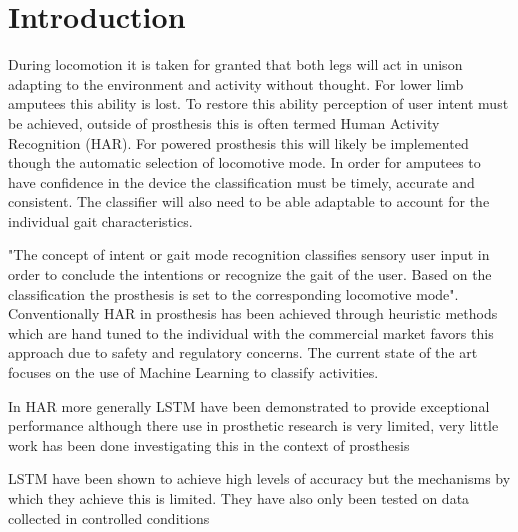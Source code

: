 \documentclass[sensors,article,submit,moreauthors,pdftex]{Definitions/mdpi}
\begin{document}

\section{Introduction} %
During locomotion it is taken for granted that both legs will act in unison adapting to the environment and activity without thought. For lower limb amputees this ability is lost. To restore this ability perception of user intent must be achieved, outside of prosthesis this is often termed Human Activity Recognition (HAR). For powered prosthesis this will likely be implemented though the automatic selection of locomotive mode\cite{Tucker2015, Windrich2016, Zhang2015}. In order for amputees to have confidence in the device the classification must be timely, accurate and consistent\cite{Pedroli2019, Sinha2011}. The classifier will also need to be able adaptable to account for the individual gait characteristics\cite{Ponce2016}.

"The concept of intent or gait mode recognition classifies sensory user input in order to conclude the intentions or recognize the gait of the user. Based on the classification the prosthesis is set to the corresponding locomotive mode"\cite{Windrich2016}. Conventionally HAR in prosthesis has been achieved through heuristic methods which are hand tuned to the individual\cite{Maqbool2017, Xu2018} with the commercial market favors this approach due to safety and regulatory concerns\cite{Fluit2020}. The current state of the art focuses on the use of Machine Learning to classify activities\cite{Labarriere2020}.

In HAR more generally LSTM have been demonstrated to provide exceptional performance\cite{Murad2017} although there use in prosthetic research is very limited, very little work has been done investigating this in the context of prosthesis\cite{Fluit2020}

LSTM have been shown to achieve high levels of accuracy but the mechanisms by which they achieve this is limited. They have also only been tested on data collected in controlled conditions
\end{document}

